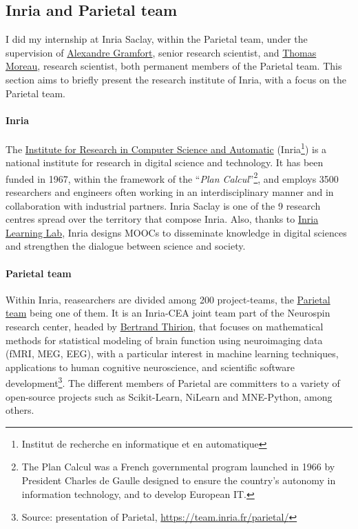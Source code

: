 \subsection{Inria and Parietal team}

I did my internship at Inria Saclay, within the Parietal team, under the supervision of \href{http://alexandre.gramfort.net}{Alexandre Gramfort}, senior research scientist, and \href{https://tommoral.github.io/about.html}{Thomas Moreau}, research scientist, both permanent members of the Parietal team.
This section aims to briefly present the research institute of Inria, with a focus on the Parietal team.

\paragraph{Inria} The \href{https://www.inria.fr/fr}{Institute for Research in Computer Science and Automatic} (Inria\footnote{Institut de recherche en informatique et en automatique}) is a national institute for research in digital science and technology.
It has been funded in 1967, within the framework of the ``\textit{Plan Calcul}''\footnote{The Plan Calcul was a French governmental program launched in 1966 by President Charles de Gaulle designed to ensure the country's autonomy in information technology, and to develop European IT.}, and employs \num{3500} researchers and engineers often working in an interdisciplinary manner and in collaboration with industrial partners.
Inria Saclay is one of the 9 research centres spread over the territory that compose Inria.
 Also, thanks to \href{https://learninglab.inria.fr}{Inria Learning Lab}, Inria designs MOOCs to disseminate knowledge in digital sciences and strengthen the dialogue between science and society.


\paragraph{Parietal team} Within Inria, reasearchers are divided among \num{200} project-teams, the \href{https://team.inria.fr/parietal/}{Parietal team} being one of them.
It is an Inria-CEA joint team part of the Neurospin research center, headed by \href{https://pages.saclay.inria.fr/bertrand.thirion/}{Bertrand Thirion}, that focuses on mathematical methods for statistical modeling of brain function using neuroimaging data (fMRI, MEG, EEG), with a particular interest in machine learning techniques, applications to human cognitive neuroscience, and scientific software development\footnote{Source: presentation of Parietal, \url{https://team.inria.fr/parietal/}}.
The different members of Parietal are committers to a variety of open-source projects such as Scikit-Learn, 
NiLearn and MNE-Python, among others.
